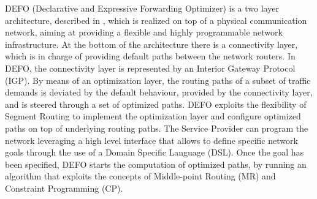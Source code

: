 DEFO (Declarative and Expressive Forwarding Optimizer) is a two layer architecture, described in \cite{defo1}, which is realized on top of a physical communication network, aiming at providing a flexible and highly programmable network infrastructure.
At the bottom of the architecture there is a connectivity layer, which is in charge of providing default paths between the network routers.
In DEFO, the connectivity layer is represented by an Interior Gateway Protocol (IGP).
By means of an optimization layer, the routing paths of a subset of traffic demands is deviated by the default behaviour, provided by the connectivity layer, and is steered through a set of optimized paths.
DEFO exploits the flexibility of Segment Routing to implement the optimization layer and configure optimized paths on top of underlying routing paths.
The Service Provider can program the network leveraging a high level interface that allows to define specific network goals through the use of a Domain Specific Language (DSL).
Once the goal has been specified, DEFO starts the computation of optimized paths, by running an algorithm that exploits the concepts of Middle-point Routing (MR) and Constraint Programming (CP).

